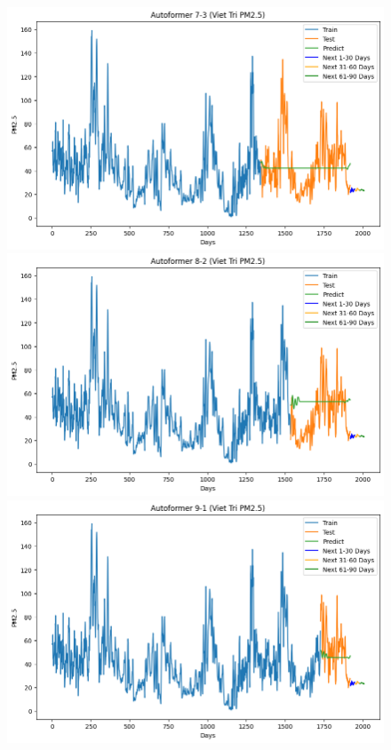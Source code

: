 \begin{figure}[H]
{\begin{adjustbox}{minipage=0.48\textwidth}
\begin{minipage}{0.3\textwidth}
            \end{minipage}\hfill
            \begin{minipage}{0.3\textwidth}
                \centering
                \includegraphics[width=\textwidth]{img/final/Autoformer/90D/Autoformer_7_3_VT.png}\\
                \includegraphics[width=\textwidth]{img/final/Autoformer/90D/Autoformer_8_2_VT.png}\\
                \includegraphics[width=\textwidth,height=0.6\textwidth]{img/final/Autoformer/90D/Autoformer_9_1_VT.png}
            \end{minipage}
        \end{adjustbox}
    }


\end{figure}
